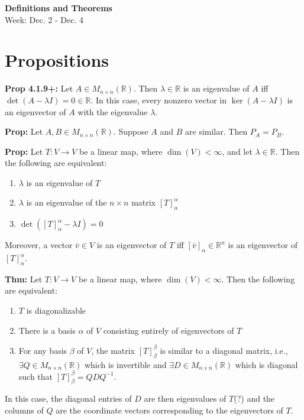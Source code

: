 \noindent
\textbf{\LARGE Definitions and Theorems} \\
\large Week: Dec. 2 - Dec. 4

\normalsize

\section*{Propositions}
\textbf{Prop 4.1.9+:} Let $A \in M_{n \times n}(\mathbb{R})$. Then $\lambda \in \mathbb{R}$ is an eigenvalue of $A$ iff $\det(A-\lambda I)=0 \in \mathbb{R}$. In this case, every nonzero vector in $\ker(A-\lambda I)$ is an eigenvector of $A$ with the eigenvalue $\lambda$.

\bigskip 

\noindent 
\textbf{Prop:} Let $A, B \in M_{n \times n}(\mathbb{R})$. Suppose $A$ and $B$ are similar. Then $P_A = P_B$.

\bigskip 

\noindent 
\textbf{Prop:} Let $T: V \rightarrow V$ be a linear map, where $\dim(V) < \infty$, and let $\lambda \in \mathbb{R}$. Then the following are equivalent:
\begin{enumerate}
    \item $\lambda$ is an eigenvalue of $T$ 
    \item $\lambda$ is an eigenvalue of the $n \times n$ matrix $[T]_\alpha^\alpha$
    \item $\det([T]_\alpha^\alpha-\lambda I)=0$ 
\end{enumerate}
Moreover, a vector $\bar v \in V$ is an eigenvector of $T$ iff $[\bar v]_\alpha \in \mathbb{R}^n$ is an eigenvector of $[T]_\alpha^\alpha$.

\bigskip 

\noindent 
\textbf{Thm:} Let $T: V \rightarrow V$ be a linear map, where $\dim(V) < \infty$. Then the following are equivalent:
\begin{enumerate}
    \item $T$ is diagonalizable 
    \item There is a basis $\alpha$ of $V$ consisting entirely of eigenvectors of $T$ 
    \item For any basis $\beta$ of $V$, the matrix $[T]_\beta^\beta$ is similar to a diagonal matrix, i.e., $\exists Q \in M_{n \times n}(\mathbb{R})$ which is invertible and $\exists D \in M_{n \times n}(\mathbb{R})$ which is diagonal such that $[T]_\beta^\beta=QDQ^{-1}$.
\end{enumerate}
In this case, the diagonal entries of $D$ are then eigenvalues of $T$(?) and the columns of $Q$ are the coordinate vectors corresponding to the eigenvectors of $T$.

